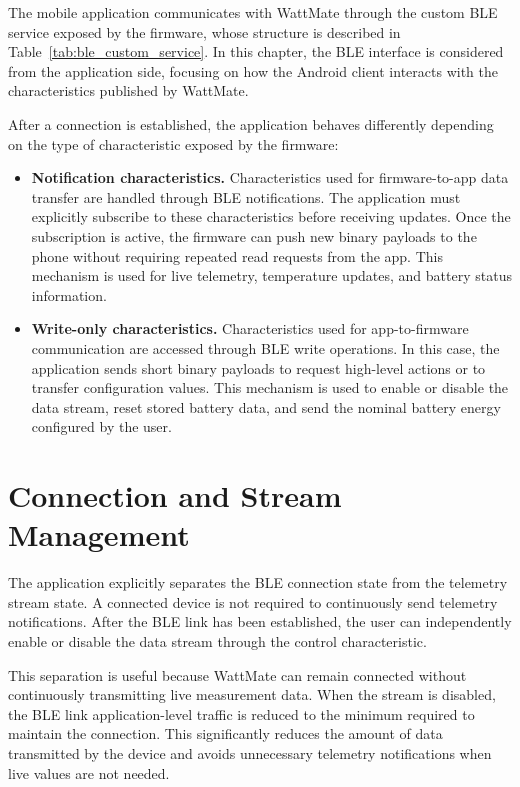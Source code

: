 The mobile application communicates with WattMate through the custom BLE service exposed by the firmware, whose structure is described in Table~\ref{tab:ble_custom_service}. 
In this chapter, the BLE interface is considered from the application side, focusing on how the Android client interacts with the characteristics published by WattMate.

After a connection is established, the application behaves differently depending on the type of characteristic exposed by the firmware:

\begin{itemize}
	\item \textbf{Notification characteristics.}
	Characteristics used for firmware-to-app data transfer are handled through BLE notifications. 
	The application must explicitly subscribe to these characteristics before receiving updates. 
	Once the subscription is active, the firmware can push new binary payloads to the phone without requiring repeated read requests from the app. 
	This mechanism is used for live telemetry, temperature updates, and battery status information.
	
	\item \textbf{Write-only characteristics.}
	Characteristics used for app-to-firmware communication are accessed through BLE write operations. 
	In this case, the application sends short binary payloads to request high-level actions or to transfer configuration values. 
	This mechanism is used to enable or disable the data stream, reset stored battery data, and send the nominal battery energy configured by the user.
\end{itemize}


\section{Connection and Stream Management}
\label{sec:app_connection_stream}

The application explicitly separates the BLE connection state from the telemetry stream state. 
A connected device is not required to continuously send telemetry notifications. 
After the BLE link has been established, the user can independently enable or disable the data stream through the control characteristic.

This separation is useful because WattMate can remain connected without continuously transmitting live measurement data. 
When the stream is disabled, the BLE link application-level traffic is reduced to the minimum required to maintain the connection. 
This significantly reduces the amount of data transmitted by the device and avoids unnecessary telemetry notifications when live values are not needed.

